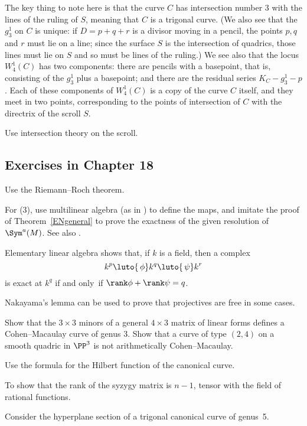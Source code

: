 The key thing to note here is that the curve $C$ has intersection number
3 with the lines of the ruling of $S$, meaning that $C$ is a trigonal
curve. (We also see that the $g^1_3$ on $C$ is unique: if $D = p +
q + r$ is a divisor moving in a pencil, the points $p, q$ and $r$ must
lie on a line; since the surface $S$ is the intersection of quadrics,
those lines must lie on $S$ and so must be  lines  of the ruling.) We
see also that the locus $W^1_4(C)$ has two components: there are pencils
with a basepoint, that is, consisting of the $g^1_3$ plus a basepoint;
and there are the residual series $K_C - g^1_3 - p$. Each of these
components of $W^1_4(C)$ is a copy of the curve $C$ itself, and they
meet in two points, corresponding to the points of intersection of $C$
with the directrix of the scroll $S$.

Use intersection theory on the scroll.
%

\subsection*{Exercises in Chapter 18}

Use the Riemann--Roch theorem.

For (3), use multilinear algebra (as in \cite{Eisenbud1995}) to define the
maps, and imitate the proof of Theorem~\ref{ENgeneral} to prove
the exactness of the given resolution of $\Sym^a(M)$. See also
\cite[Appendix A2.6]{Eisenbud1995}.

Elementary linear algebra shows that, if $k$ is a field, then a
complex 
$$k^p \luto{\,\phi} k^q \luto{\,\psi} k^r$$ 
is exact at $k^q$ if and
only~if $\rank \phi +\rank \psi = q$.

Nakayama's lemma can be used to prove that projectives are free
%
in some cases.

Show that the $3\times 3$ minors of a general $4\times 3$ matrix
of linear forms defines a Cohen--Macaulay curve
of genus 3. Show that a curve of type $(2,4)$ on a smooth quadric in
$\PP^3$ is not arithmetically Cohen--Macaulay.

Use the formula for the Hilbert function of the canonical curve.

To show that the rank of the syzygy matrix is $n-1$, tensor with
the field of rational functions.

Consider the
hyperplane section of a trigonal canonical curve of genus~5.

